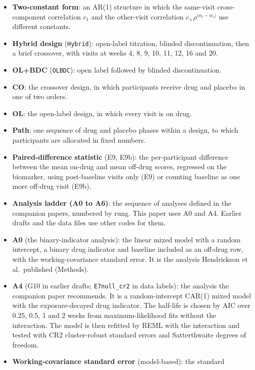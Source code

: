 \documentclass[
  11pt,
]{article}
\begin{document}
\begin{itemize}
  so that the response block is a Kronecker product.
\item
  \textbf{Two-constant form}: an AR(1) structure in which the same-visit
  cross-component correlation \(c_1\) and the other-visit correlation
  \(c_\times\rho^{\lvert w_t - w_s\rvert}\) use different constants.
\item
  \textbf{Hybrid design} (\texttt{Hybrid}): open-label titration, blinded
  discontinuation, then a brief crossover, with visits at weeks 4, 8,
  9, 10, 11, 12, 16 and 20.
\item
  \textbf{OL+BDC} (\texttt{OLBDC}): open label followed by blinded
  discontinuation.
\item
  \textbf{CO}: the crossover design, in which participants receive drug and
  placebo in one of two orders.
\item
  \textbf{OL}: the open-label design, in which every visit is on drug.
\item
  \textbf{Path}: one sequence of drug and placebo phases within a design,
  to which participants are allocated in fixed numbers.
\item
  \textbf{Paired-difference statistic} (E9, E9b): the per-participant
  difference between the mean on-drug and mean off-drug scores,
  regressed on the biomarker, using post-baseline visits only (E9) or
  counting baseline as one more off-drug visit (E9b).
\item
  \textbf{Analysis ladder (A0 to A6)}: the sequence of analyses defined
  in the companion papers, numbered by rung. This paper uses A0 and
  A4. Earlier drafts and the data files use other codes for them.
\item
  \textbf{A0} (the binary-indicator analysis): the linear mixed model with
  a random intercept, a binary drug indicator and baseline included
  as an off-drug row, with the working-covariance standard error. It
  is the analysis Hendrickson et al.~published (Methods).
\item
  \textbf{A4} (G10 in earlier drafts; \texttt{E7null\_cr2} in data labels): the
  analysis the companion paper recommends. It is a random-intercept
  CAR(1) mixed model with the exposure-decayed drug indicator. The
  half-life is chosen by AIC over 0.25, 0.5, 1 and 2 weeks from
  maximum-likelihood fits without the interaction. The model is then
  refitted by REML with the
  interaction and tested with CR2 cluster-robust standard errors and
  Satterthwaite degrees of freedom.
\item
  \textbf{Working-covariance standard error} (model-based): the standard

\end{itemize}
\end{document}
